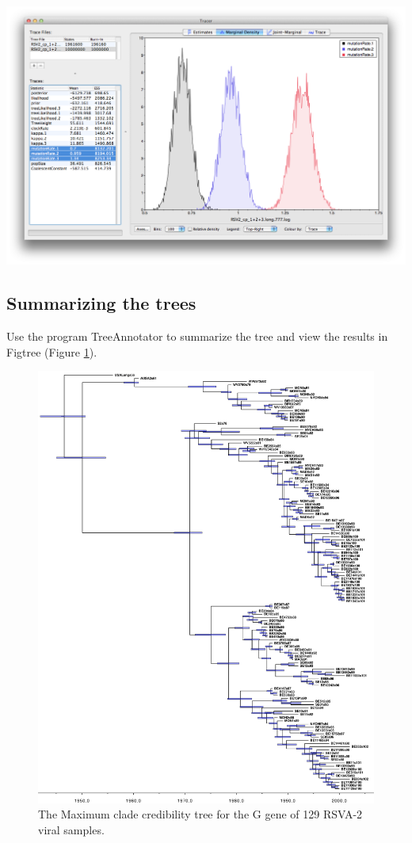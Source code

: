 \documentclass[12pt]{article}
\begin{document}
\medskip{}

\includegraphics[width=\textwidth]{figures/Tracer_relativeRates}

\subsection*{Summarizing the trees}

Use the program TreeAnnotator to summarize the tree and view the results in Figtree (Figure \ref{fig:RSV2tree}).

\begin{figure}

\includegraphics[width=\textwidth]{figures/RSV2_mcc_tree.pdf}

\caption{The Maximum clade credibility tree for the G gene of 129 RSVA-2 viral samples. }
\label{fig:RSV2tree}
\end{figure}
\end{document}

